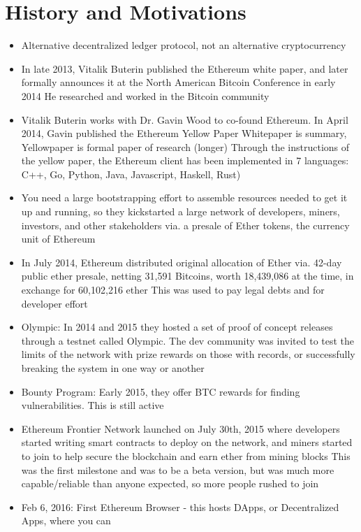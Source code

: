 \documentclass{article}
\begin{document}
\section*{History and Motivations}
\begin{itemize}
  \item Alternative decentralized ledger protocol, not an alternative cryptocurrency
  \item In late 2013, Vitalik Buterin published the Ethereum white paper, and later formally announces it at the North American Bitcoin Conference in early 2014
    \subitem He researched and worked in the Bitcoin community
  \item Vitalik Buterin works with Dr. Gavin Wood to co-found Ethereum. In April 2014, Gavin published the Ethereum Yellow Paper
    \subitem Whitepaper is summary, Yellowpaper is formal paper of research (longer)
    \subitem Through the instructions of the yellow paper, the Ethereum client has been implemented in 7 languages: C++, Go, Python, Java, Javascript, Haskell, Rust)
  \item You need a large bootstrapping effort to assemble resources needed to get it up and running, so they kickstarted a large network of developers, miners, investors,
    and other stakeholders via. a presale of Ether tokens, the currency unit of Ethereum
  \item In July 2014, Ethereum distributed original allocation of Ether via. 42-day public ether presale, netting 31,591 Bitcoins, worth 18,439,086 at the time, in exchange
    for 60,102,216 ether
    \subitem This was used to pay legal debts and for developer effort
  \item Olympic: In 2014 and 2015 they hosted a set of proof of concept releases through a testnet called Olympic. The dev community was invited to test the limits of the network
    with prize rewards on those with records, or successfully breaking the system in one way or another
  \item Bounty Program: Early 2015, they offer BTC rewards for finding vulnerabilities. This is still active
  \item Ethereum Frontier Network launched on July 30th, 2015 where developers started writing smart contracts to deploy on the network, and miners started to join
    to help secure the blockchain and earn ether from mining blocks
    \subitem This was the first milestone and was to be a beta version, but was much more capable/reliable than anyone expected, so more people rushed to join
  \item Feb 6, 2016: First Ethereum Browser - this hosts DApps, or Decentralized Apps, where you can 

\end{itemize}
\end{document}
